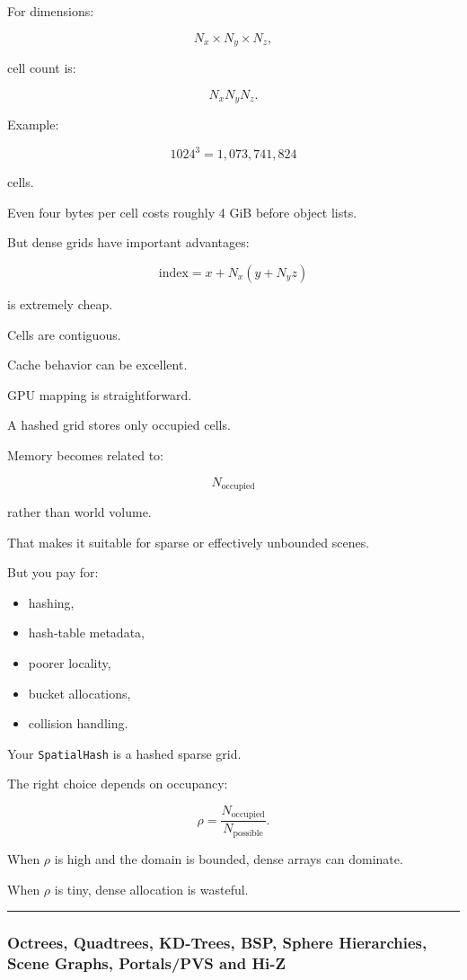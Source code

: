 For dimensions:

\[
N_x\times N_y\times N_z,
\]

cell count is:

\[
N_xN_yN_z.
\]

Example:

\[
1024^3
=
1,073,741,824
\]

cells.

Even four bytes per cell costs roughly 4 GiB before object lists.

But dense grids have important advantages:

\[
\text{index}
=
x+N_x(y+N_yz)
\]

is extremely cheap.

Cells are contiguous.

Cache behavior can be excellent.

GPU mapping is straightforward.

A hashed grid stores only occupied cells.

Memory becomes related to:

\[
N_{\text{occupied}}
\]

rather than world volume.

That makes it suitable for sparse or effectively unbounded scenes.

But you pay for:

\begin{itemize}
\tightlist
\item
  hashing,
\item
  hash-table metadata,
\item
  poorer locality,
\item
  bucket allocations,
\item
  collision handling.
\end{itemize}

Your \texttt{SpatialHash} is a hashed sparse grid.

The right choice depends on occupancy:

\[
\rho=
\frac{N_{\text{occupied}}}
{N_{\text{possible}}}.
\]

When \(\rho\) is high and the domain is bounded, dense arrays can dominate.

When \(\rho\) is tiny, dense allocation is wasteful.

\begin{center}\rule{0.5\linewidth}{0.5pt}\end{center}

\subsubsection{Octrees, Quadtrees, KD-Trees, BSP, Sphere Hierarchies, Scene Graphs, Portals/PVS and Hi-Z}\label{octrees-quadtrees-kd-trees-bsp-sphere-hierarchies-scene-graphs-portalspvs-and-hi-z}

